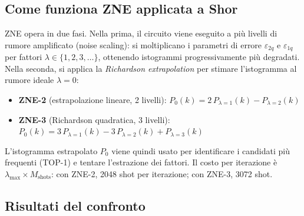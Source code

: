 \begin{onehalfspace}
\subsection{Come funziona ZNE applicata a Shor}

\ac{ZNE} opera in due fasi. Nella prima, il circuito viene eseguito a più livelli di rumore amplificato (noise scaling): si moltiplicano i parametri di errore $\varepsilon_{2q}$ e $\varepsilon_{1q}$ per fattori $\lambda \in \{1, 2, 3, \ldots\}$, ottenendo istogrammi progressivamente più degradati. Nella seconda, si applica la \textit{Richardson extrapolation} per stimare l'istogramma al rumore ideale $\lambda=0$:

\begin{itemize}
    \item \textbf{ZNE-2} (estrapolazione lineare, 2 livelli): $P_0(k) = 2\,P_{\lambda=1}(k) - P_{\lambda=2}(k)$
    \item \textbf{ZNE-3} (Richardson quadratica, 3 livelli): $P_0(k) = 3\,P_{\lambda=1}(k) - 3\,P_{\lambda=2}(k) + P_{\lambda=3}(k)$
\end{itemize}

L'istogramma estrapolato $P_0$ viene quindi usato per identificare i candidati più frequenti (TOP-1) e tentare l'estrazione dei fattori. Il costo per iterazione è $\lambda_{\max} \times M_{\text{shots}}$: con ZNE-2, 2048 shot per iterazione; con ZNE-3, 3072 shot.

\subsection{Risultati del confronto}

\begin{table}[H]
\centering
\caption{Confronto M1, ZNE-2, ZNE-3 e $M_{\text{TOP4}}$ su UC1 ($K_{\text{rep}}=30$, $M_{\text{shots}}=1024$ per livello)}
\label{tab:confronto_zne}


\end{table}
\end{onehalfspace}
